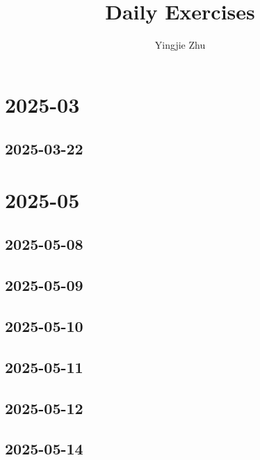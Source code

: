 \documentclass[11pt,a4paper]{article}
\title{Daily Exercises}
\author{Yingjie Zhu}
\begin{document}
\maketitle

\tableofcontents

\section{2025-03}

\subsection{2025-03-22}


\section{2025-05}


\subsection{2025-05-08}




\subsection{2025-05-09}




\subsection{2025-05-10}



\subsection{2025-05-11}



\subsection{2025-05-12}




\subsection{2025-05-14}
\end{document}
